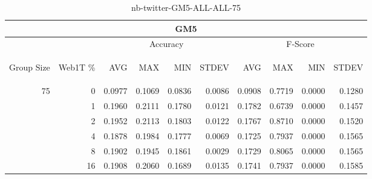 \begin{center}
\begin{table}[htbp]
\begin{tabular}{ | r | r | r | r | r | r | r | r | r | r |}
\hline
\multicolumn{10}{|c|}{GM5}\\
\hline
 & & \multicolumn{4}{|c|}{Accuracy} & \multicolumn{4}{|c|}{F-Score}\\ \cline{3-10}
\begin{sideways}Group Size\end{sideways} & \begin{sideways}Web1T \%\end{sideways} & \begin{sideways}AVG\end{sideways} & \begin{sideways}MAX\end{sideways} & \begin{sideways}MIN\end{sideways} & \begin{sideways}STDEV\end{sideways} & \begin{sideways}AVG\end{sideways} & \begin{sideways}MAX\end{sideways} & \begin{sideways}MIN\end{sideways} & \begin{sideways}STDEV\end{sideways}\\
\hline
\multirow{5}{*}{75}
 & 0 & 0.0977 & 0.1069 & 0.0836 & 0.0086 & 0.0908 & 0.7719 & 0.0000 & 0.1280\\ \cline{2-10}
 & 1 & 0.1960 & 0.2111 & 0.1780 & 0.0121 & 0.1782 & 0.6739 & 0.0000 & 0.1457\\ \cline{2-10}
 & 2 & 0.1952 & 0.2113 & 0.1803 & 0.0122 & 0.1767 & 0.8710 & 0.0000 & 0.1520\\ \cline{2-10}
 & 4 & 0.1878 & 0.1984 & 0.1777 & 0.0069 & 0.1725 & 0.7937 & 0.0000 & 0.1565\\ \cline{2-10}
 & 8 & 0.1902 & 0.1945 & 0.1861 & 0.0029 & 0.1729 & 0.8065 & 0.0000 & 0.1565\\ \cline{2-10}
 & 16 & 0.1908 & 0.2060 & 0.1689 & 0.0135 & 0.1741 & 0.7937 & 0.0000 & 0.1585\\ \cline{2-10}
\hline
\end{tabular}
\caption{nb-twitter-GM5-ALL-ALL-75}
\label{table:nb-twitter-GM5-ALL-ALL-75}
\end{table}
\end{center}

